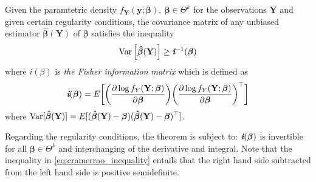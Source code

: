 \begin{theorem} 
\label{th:cramerrao_inequality}
Given the paramtetric density $f_{\textbf{Y}}(\textbf{y};\boldsymbol{\beta}), \ \boldsymbol{\beta} \in \Theta^k$ for the observations $\textbf{Y}$ and given certain regularity conditions, the covariance matrix of any unbiased estimator $\boldsymbol{\hat{\beta}}(\textbf{Y})$ of $\boldsymbol{\beta}$ satisfies the inequality
\begin{align} \label{eq:cramerrao_inequality}
    \operatorname{\text{Var}} \Big[ \boldsymbol{\hat{\beta}}(\textbf{Y})\Big] \geq \textit{\textbf{i}}^{-1}(\boldsymbol{\beta})
\end{align}
where $\textit{i}(\beta)$ is \textit{the Fisher information matrix} which is defined as
\begin{align*}
    \textit{\textbf{i}}(\boldsymbol{\beta})=E \bigg[ \bigg(\frac{\partial \log f_Y(\textbf{Y};\boldsymbol{\beta})}{\partial \boldsymbol{\beta}} \bigg)\bigg(\frac{\partial \log f_Y(\textbf{Y};\boldsymbol{\beta})}{\partial \boldsymbol{\beta}}\bigg)^\top\bigg]
\end{align*}
where $\operatorname{\text{Var}} [\boldsymbol{\hat{\beta}}(\textbf{Y})]=E[(\boldsymbol{\hat{\beta}}(\textbf{Y})-\boldsymbol{\beta})(\boldsymbol{\hat{\beta}}(\textbf{Y})-\boldsymbol{\beta})^\top]$.
\end{theorem}
Regarding the regularity conditions, the theorem is subject to:
$\textit{\textbf{i}}(\boldsymbol{\beta})$ is invertible for all $\boldsymbol{\beta} \in \Theta^k$ and interchanging of the derivative and integral.
Note that the inequality in \eqref{eq:cramerrao_inequality} entails that the right hand side subtracted from the left hand side is positive semidefinite.

